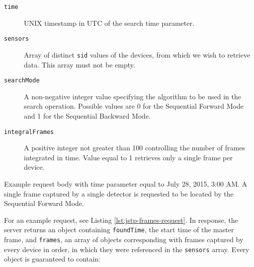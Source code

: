\begin{description}
	\item[\texttt{time}]
	UNIX timestamp in UTC of the search time parameter.

	\item[\texttt{sensors}]
	Array of distinct \texttt{sid} values of the devices, from which we wish to retrieve data. This array must not be empty.

	\item[\texttt{searchMode}]
	A non-negative integer value specifying the algorithm to be used in the search operation. Possible values are 0 for the Sequential Forward Mode and 1 for the Sequential Backward Mode.

	\item[\texttt{integralFrames}]
	A positive integer not greater than 100 controlling the number of frames integrated in time. Value equal to 1 retrieves only a single frame per device.
\end{description}

\begin{listing}
    \caption{Example request body with time parameter equal to July 28, 2015, 3:00 AM. A single frame captured by a single detector is requested to be located by the Sequential Forward Mode.}
    \label{lst:jstp-frames-request}
\end{listing}

For an example request, see Listing \ref{lst:jstp-frames-request}. In response, the server returns an object containing \texttt{foundTime}, the start time of the master frame, and \texttt{frames}, an array of objects corresponding with frames captured by  every device in order, in which they were referenced in the \texttt{sensors} array. Every object is guaranteed to contain:

